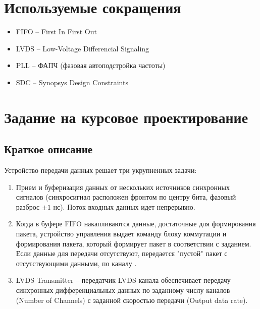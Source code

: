 





\section*{Используемые сокращения}

\begin{itemize}
	\item FIFO -- First In First Out
	\item LVDS -- Low-Voltage Differencial Signaling
	\item PLL -- ФАПЧ (фазовая автоподстройка частоты)
	\item SDC -- Synopsys Design Constraints
\end{itemize}

\newpage

\section*{Задание на курсовое проектирование}

\subsection*{Краткое описание}

Устройство передачи данных решает три укрупненных задачи:
\begin{enumerate}
	\item Прием и буферизация данных от нескольких источников синхронных сигналов (синхросигнал расположен фронтом по центру бита, фазовый разброс $\pm1$ нс). Поток входных данных идет непрерывно.
	\item Когда в буфере FIFO накапливаются данные, достаточные для формирования пакета, устройство управления выдает команду блоку коммутации и формирования пакета, который формирует пакет в соответствии с заданием. Если данные для передачи отсутствуют, передается "пустой" пакет с отсутствующими данными,  по каналу .
	\item LVDS Transmitter -- передатчик LVDS канала обеспечивает передачу синхронных дифференциальных данных по заданному числу каналов (Number of Channels) с заданной скоростью передачи (Output data rate).
\end{enumerate}

